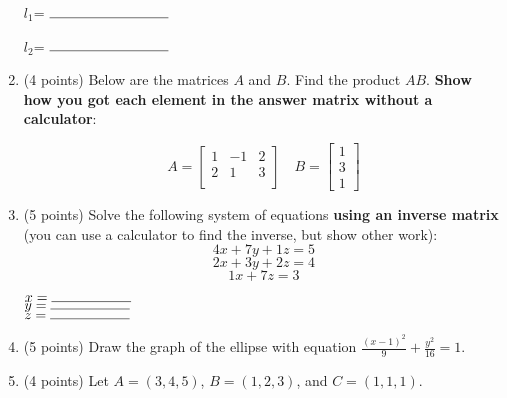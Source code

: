 \documentclass[11pt]{article}
\begin{document}
\begin{enumerate}
\begin{flushright}
$l_1$= $\rule{3cm}{0.4pt}$
\end{flushright}

\begin{flushright}
$l_2$= $\rule{3cm}{0.4pt}$
\end{flushright}


\item (4 points) Below are the matrices $A$ and $B$.  Find the product $AB$. \textbf{Show how you got each element in the answer matrix without a calculator}:

\[
A=
  \begin{bmatrix}
    1 & -1 & 2 \\
    2 & 1 & 3 \\
  \end{bmatrix} \quad
B=
  \begin{bmatrix}
    1 \\
    3 \\
    1
  \end{bmatrix}
\]

\newpage

\item (5 points) Solve the following system of equations \textbf{using an inverse matrix} (you can use a calculator to find the inverse, but show other work): 
$$ 4x + 7y + 1z = 5 $$
$$ 2x + 3y + 2z = 4 $$
$$ 1x + 7z = 3 $$
\vspace{120pt}
\begin{flushright}
$x = \rule{2cm}{0.4pt}$ \\
$y = \rule{2cm}{0.4pt}$ \\
$z = \rule{2cm}{0.4pt}$
\end{flushright}

\vspace{30pt}
\item (5 points) Draw the graph of the ellipse with equation $\displaystyle \frac{(x-1)^2}{9} +  \frac{y^2}{16} = 1$.

\begin{center}
\end{center}

\item (4 points) Let $A = (3, 4, 5)$, $B = (1, 2, 3)$, and $C = (1, 1, 1)$. 
\begin{enumerate}[itemsep=10pt, label={\alph*)}]


\end{enumerate}
\end{enumerate}
\end{document}
